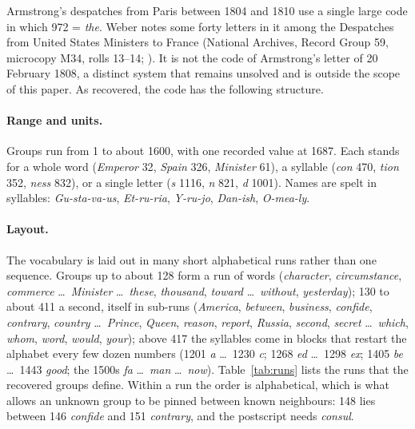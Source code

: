 \documentclass[]{interact}
\newcommand{\grp}[1]{\textsf{#1}}
\begin{document}
Armstrong's despatches from Paris between 1804 and 1810 use a single large code in which \grp{972} = \emph{the}. Weber notes some forty letters in it among the Despatches from United States Ministers to France (National Archives, Record Group 59, microcopy M34, rolls 13--14; \citealp{Weber:1979}). It is not the code of Armstrong's letter of 20 February 1808, a distinct system that remains unsolved and is outside the scope of this paper. As recovered, the code has the following structure.

\paragraph{Range and units.} Groups run from 1 to about 1600, with one recorded value at 1687. Each stands for a whole word (\emph{Emperor} \grp{32}, \emph{Spain} \grp{326}, \emph{Minister} \grp{61}), a syllable (\emph{con} \grp{470}, \emph{tion} \grp{352}, \emph{ness} \grp{832}), or a single letter (\emph{s} \grp{1116}, \emph{n} \grp{821}, \emph{d} \grp{1001}). Names are spelt in syllables: \emph{Gu-sta-va-us}, \emph{Et-ru-ria}, \emph{Y-ru-jo}, \emph{Dan-ish}, \emph{O-mea-ly}.

\paragraph{Layout.} The vocabulary is laid out in many short alphabetical runs rather than one sequence. Groups up to about 128 form a run of words (\emph{character}, \emph{circumstance}, \emph{commerce} \ldots\ \emph{Minister} \ldots\ \emph{these}, \emph{thousand}, \emph{toward} \ldots\ \emph{without}, \emph{yesterday}); 130 to about 411 a second, itself in sub-runs (\emph{America}, \emph{between}, \emph{business}, \emph{confide}, \emph{contrary}, \emph{country} \ldots\ \emph{Prince}, \emph{Queen}, \emph{reason}, \emph{report}, \emph{Russia}, \emph{second}, \emph{secret} \ldots\ \emph{which}, \emph{whom}, \emph{word}, \emph{would}, \emph{your}); above 417 the syllables come in blocks that restart the alphabet every few dozen numbers (\grp{1201} \emph{a} \ldots\ \grp{1230} \emph{c}; \grp{1268} \emph{ed} \ldots\ \grp{1298} \emph{ex}; \grp{1405} \emph{be} \ldots\ \grp{1443} \emph{good}; the 1500s \emph{fa} \ldots\ \emph{man} \ldots\ \emph{now}). Table~\ref{tab:runs} lists the runs that the recovered groups define. Within a run the order is alphabetical, which is what allows an unknown group to be pinned between known neighbours: \grp{148} lies between \grp{146} \emph{confide} and \grp{151} \emph{contrary}, and the postscript needs \emph{consul}.
\end{document}
